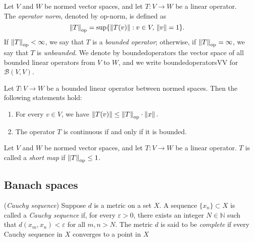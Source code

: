 \begin{definition} \label{def:op_norm}
Let \( V \) and \( W \) be normed vector spaces, and let \( T: V \rightarrow W \) be a linear operator. The \emph{operator norm}, denoted by \gls{op-norm}, is defined as
\[
\left\lVert T \right\rVert_{\text{op}} = \sup \{ \left\lVert T(v) \right\rVert : v \in V, \, \left\lVert v \right\rVert = 1 \}.
\]
If \( \left\lVert T \right\rVert_{\text{op}} < \infty \), we say that \( T \) is a \emph{bounded operator}; otherwise, if \( \left\lVert T \right\rVert_{\text{op}} = \infty \), we say that \( T \) is \emph{unbounded}. We denote by \gls{boundedoperators} the vector space of all bounded linear operators from \( V \) to \( W \), and we write  \gls{boundedoperatorsVV} for \( \mathcal{B}(V, V) \).
\end{definition}

\begin{lemma} \cite[Lemma 6.4]{InfiniteDimensionalAnalysis2006} \label{lemma:op_norm_submult} %
Let \( T: V \rightarrow W \) be a bounded linear operator between normed spaces. Then the following statements hold:
\begin{enumerate}
  \item For every \( v \in V \), we have $
  \left\lVert T(v) \right\rVert \leq \left\lVert T \right\rVert_{\text{op}} \cdot \left\lVert x \right\rVert.$
  \item The operator \( T \) is continuous if and only if it is bounded.
\end{enumerate}
\end{lemma}




\begin{definition}
  Let \( V \) and \( W \) be normed vector spaces, and let \( T: V \rightarrow W \) be a linear operator. $T$ is called a \emph{short map} if $\left\lVert T \right\rVert_{\text{op}} \leq 1$.
\end{definition}



\subsection{Banach spaces}


\begin{definition} (\emph{Cauchy sequence})
  Suppose $ d $ is a metric on a set $ X $. A sequence $ \{x_n\} \subset X $ is called a \emph{Cauchy sequence} if, for every $ \varepsilon > 0 $, there exists an integer $N \in \mathbb{N} $ such that $ d(x_m, x_n) < \varepsilon $ for all $ m, n > N $.  The metric \( d \) is said to be \emph{complete} if every Cauchy sequence in \( X \) converges to a point in \( X \)
\end{definition}

